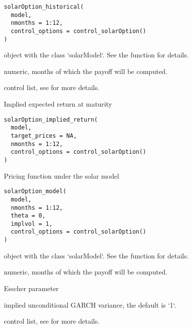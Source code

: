 \documentclass[a4paper]{book}
\begin{document}
%
\begin{Usage}
\begin{verbatim}
solarOption_historical(
  model,
  nmonths = 1:12,
  control_options = control_solarOption()
)
\end{verbatim}
\end{Usage}
%
\begin{Arguments}
\begin{ldescription}
\item[\code{model}] object with the class `solarModel`. See the function  for details.

\item[\code{nmonths}] numeric, months of which the payoff will be computed.

\item[\code{control\_options}] control list, see  for more details.
\end{ldescription}
\end{Arguments}
%
\begin{Description}\relax
Implied expected return at maturity
\end{Description}
%
\begin{Usage}
\begin{verbatim}
solarOption_implied_return(
  model,
  target_prices = NA,
  nmonths = 1:12,
  control_options = control_solarOption()
)
\end{verbatim}
\end{Usage}
%
\begin{Description}\relax
Pricing function under the solar model
\end{Description}
%
\begin{Usage}
\begin{verbatim}
solarOption_model(
  model,
  nmonths = 1:12,
  theta = 0,
  implvol = 1,
  control_options = control_solarOption()
)
\end{verbatim}
\end{Usage}
%
\begin{Arguments}
\begin{ldescription}
\item[\code{model}] object with the class `solarModel`. See the function  for details.

\item[\code{nmonths}] numeric, months of which the payoff will be computed.

\item[\code{theta}] Esscher parameter

\item[\code{implvol}] implied unconditional GARCH variance, the default is `1`.

\item[\code{control\_options}] control list, see  for more details.
\end{ldescription}
\end{Arguments}
\end{document}
